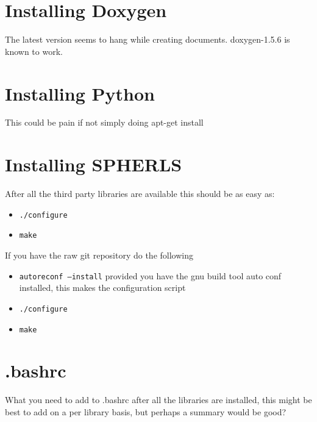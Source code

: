 \documentclass[12pt,a4paper]{book}
\begin{document}
\section{Installing Doxygen}
The latest version seems to hang while creating documents. doxygen-1.5.6 is known to work.

\section{Installing Python}
This could be pain if not simply doing apt-get install

\section{Installing SPHERLS}
After all the third party libraries are available this should be as easy as:
\begin{itemize}
\item {\tt ./configure}
\item {\tt make}
\end{itemize}
If you have the raw git repository do the following
\begin{itemize}
\item {\tt autoreconf --install} provided you have the gnu build tool auto conf installed, this makes the configuration script
\item {\tt ./configure}
\item {\tt make}
\end{itemize}
\section{.bashrc}
What you need to add to .bashrc after all the libraries are installed, this might be best to add on a per library basis, but perhaps a summary would be good?
\end{document}

